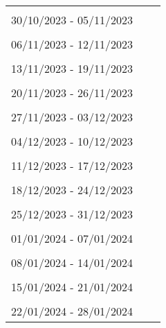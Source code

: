 \begin{table} [htb]
\centering
\begin{tabular}{p{10cm}c r} \\
\hline \\ 
 30/10/2023 - 05/11/2023\\ 
\hline \\ 
 06/11/2023 - 12/11/2023\\ 
\hline \\ 
 13/11/2023 - 19/11/2023\\ 
\hline \\ 
 20/11/2023 - 26/11/2023\\ 
\hline \\ 
 27/11/2023 - 03/12/2023\\ 
\hline \\ 
 04/12/2023 - 10/12/2023\\ 
\hline \\ 
 11/12/2023 - 17/12/2023\\ 
\hline \\ 
 18/12/2023 - 24/12/2023\\ 
\hline \\ 
 25/12/2023 - 31/12/2023\\ 
\hline \\ 
 01/01/2024 - 07/01/2024\\ 
\hline \\ 
 08/01/2024 - 14/01/2024\\ 
\hline \\ 
 15/01/2024 - 21/01/2024\\ 
\hline \\ 
 22/01/2024 - 28/01/2024\\ 

\end{tabular}
\end{table}
